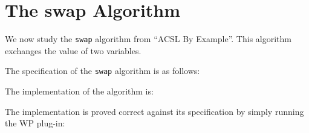 \clearpage
\section{The \textsf{swap} Algorithm}
\label{swap}

We now study the \texttt{swap} algorithm from ``ACSL By Example''.
This algorithm exchanges the value of two variables.

The specification of the \texttt{swap} algorithm is as follows:


The implementation of the algorithm is:


The implementation is proved correct against its specification by
simply running the \textsf{WP} plug-in: 


